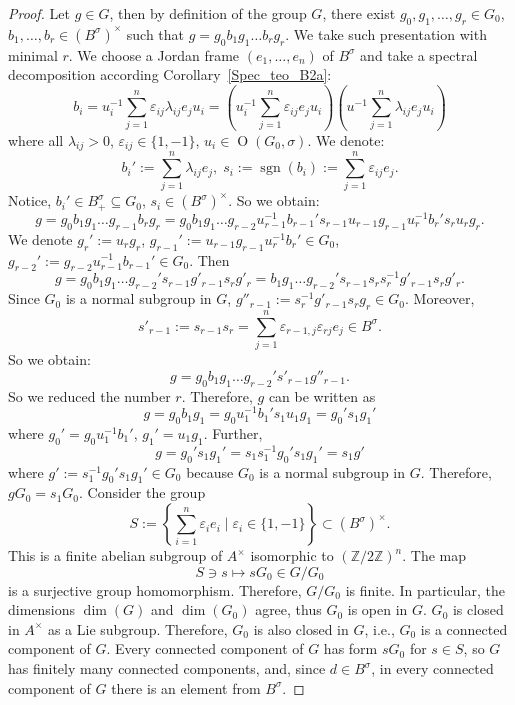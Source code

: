 \documentclass[a4paper,oneside,11pt]{amsart}
\DeclareMathOperator{\sgn}{sgn}
\DeclareMathOperator{\OO}{O}
\newcommand{\Z}{\mathbb Z}
\theoremstyle{plain}
\theoremstyle{definition}
\theoremstyle{remark}
\begin{document}
\begin{proof}
Let $g\in G$, then by definition of the group $G$, there exist $g_0,g_1,\dots, g_r\in G_0$, $b_1,\dots, b_r\in (B^{\sigma})^\times$ such that $g=g_0b_1g_1\dots b_rg_r$. We take such presentation with minimal $r$. We choose a Jordan frame $(e_1,\dots,e_n)$ of $B^{\sigma}$ and take a spectral decomposition according Corollary~\ref{Spec_teo_B2a}:
$$b_i=u^{-1}_i\sum_{j=1}^n\varepsilon_{ij}\lambda_{ij} e_ju_i=\left(u^{-1}_i\sum_{j=1}^n\varepsilon_{ij}e_j u_i\right)\left(u^{-1}\sum_{j=1}^n\lambda_{ij} e_ju_i\right)$$
where all $\lambda_{ij}>0$, $\varepsilon_{ij}\in\{1,-1\}$, $u_i\in \OO(G_0,\sigma)$. We denote:
$$b_i':=\sum_{j=1}^n\lambda_{ij} e_j,\;s_i:=\sgn(b_i):=\sum_{j=1}^n\varepsilon_{ij}e_j.$$
Notice, $b_i'\in B^{\sigma}_+\subseteq G_0$, $s_i\in (B^{\sigma})^\times$. So we obtain:
$$g=g_0b_1g_1\dots g_{r-1}b_rg_r=g_0b_1g_1\dots g_{r-2}u_{r-1}^{-1}b_{r-1}'s_{r-1}u_{r-1} g_{r-1}u_r^{-1}b_r's_ru_rg_r.$$
We denote $g_r':=u_rg_r$, $g_{r-1}':=u_{r-1} g_{r-1}u_r^{-1}b_r'\in G_0$, $g_{r-2}':=g_{r-2}u_{r-1}^{-1}b_{r-1}'\in G_0$. Then
$$g= g_0b_1g_1\dots g_{r-2}'s_{r-1}g'_{r-1}s_rg'_r=b_1g_1\dots g_{r-2}'s_{r-1}s_rs_r^{-1}g'_{r-1}s_rg'_r.$$
Since $G_0$ is a normal subgroup in $G$, $g''_{r-1}:=s_r^{-1}g'_{r-1}s_rg_r\in G_0$. Moreover, 
$$s'_{r-1}:=s_{r-1}s_r=\sum_{j=1}^n\varepsilon_{r-1,j}\varepsilon_{rj}e_j\in B^{\sigma}.$$
So we obtain:
$$g=g_0b_1g_1\dots g_{r-2}'s'_{r-1}g''_{r-1}.$$
So we reduced the number $r$. Therefore, $g$ can be written as
$$g=g_0b_1g_1=g_0u_1^{-1}b_1's_1u_1g_1=g_0's_1g_1'$$
where $g_0'=g_0u_1^{-1}b_1'$, $g_1'=u_1g_1$. Further,
$$g=g_0's_1g_1'=s_1s_1^{-1}g_0's_1g_1'=s_1g'$$
where $g':=s_1^{-1}g_0's_1g_1'\in G_0$ because $G_0$ is a normal subgroup in $G$. Therefore, $gG_0=s_1G_0$. Consider the group
$$S:=\left\{\sum_{i=1}^n\varepsilon_ie_i\mid \varepsilon_i\in\{1,-1\}\right\}\subset (B^{\sigma})^\times.$$
This is a finite abelian subgroup of $A^\times$ isomorphic to $(\Z/2\Z)^n$. The map 
$$S\ni s\mapsto sG_0\in G/G_0$$ 
is a surjective group homomorphism. Therefore, $G/G_0$ is finite. In particular, the dimensions $\dim(G)$ and $\dim(G_0)$ agree, thus $G_0$ is open in $G$. $G_0$ is closed in $A^\times$ as a Lie subgroup. Therefore, $G_0$ is also closed in $G$, i.e., $G_0$ is a connected component of $G$. Every connected component of $G$ has form $sG_0$ for $s\in S$, so $G$ has finitely many connected components, and, since $d\in B^{\sigma}$, in every connected component of $G$ there is an element from $B^{\sigma}$.
\end{proof}
\end{document}
